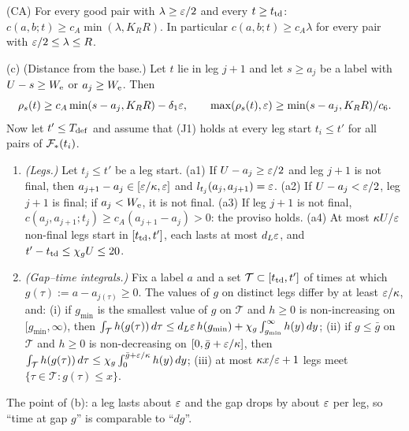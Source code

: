 \begin{lemma}[Toolkit]\label{lem:toolkit}
\textup{(CA)} For every good pair with $\lambda\ge\varepsilon/2$ and every $t\ge t_{\mathrm{td}}$: $c(a,b;t)\ge c_A\min(\lambda,K_RR)$.
In particular $c(a,b;t)\ge c_A\lambda$ for every pair with $\varepsilon/2\le\lambda\le R$.

\textup{(c) (Distance from the base.)} Let $t$ lie in leg $j+1$ and let $s\ge a_j$ be a label with $U-s\ge W_{\mathrm{e}}$ or
$a_j\ge W_{\mathrm{e}}$. Then
\[
\rho_s(t)\ge c_A\min(s-a_j,K_RR)-\delta_1\varepsilon,\qquad \max(\rho_s(t),\varepsilon)\ge\min(s-a_j,K_RR)/c_6 .
\]
Now let $t'\le T_{\mathrm{def}}$ and assume that \textup{(J1)} holds at every leg start $t_i\le t'$ for all pairs of $\mathcal{F}_*(t_i)$.
\begin{enumerate}
\setlength{\itemsep}{1pt}\setlength{\parskip}{0pt}
\item[\textup{(a)}] \emph{(Legs.)} Let $t_j\le t'$ be a leg start. (a1) If $U-a_j\ge\varepsilon/2$ and leg $j+1$ is not final,
then $a_{j+1}-a_j\in[\varepsilon/\kappa,\varepsilon]$ and $l_{t_j}(a_j,a_{j+1})=\varepsilon$. (a2) If $U-a_j<\varepsilon/2$, leg $j+1$ is final; if
$a_j<W_{\mathrm{e}}$, it is not final. (a3) If leg $j+1$ is not final, $c(a_j,a_{j+1};t_j)\ge c_A(a_{j+1}-a_j)>0$: the proviso
holds. (a4) At most $\kappa U/\varepsilon$ non-final legs start in $[t_{\mathrm{td}},t']$, each lasts at most $d_L\varepsilon$, and
$t'-t_{\mathrm{td}}\le\chi_gU\le20$.
\item[\textup{(b)}] \emph{(Gap--time integrals.)} Fix a label $a$ and a set $\mathcal T\subset[t_{\mathrm{td}},t']$ of times at
which $g(\tau):=a-a_{j(\tau)}\ge0$. The values of $g$ on distinct legs differ by at least $\varepsilon/\kappa$, and:
(i) if $g_{\min}$ is the smallest value of $g$ on $\mathcal T$ and $h\ge0$ is non-increasing on $[g_{\min},\infty)$,
then $\int_{\mathcal T}h(g(\tau))\,d\tau\le d_L\varepsilon\,h(g_{\min})+\chi_g\int_{g_{\min}}^\infty h(y)\,dy$;
(ii) if $g\le\bar g$ on $\mathcal T$ and $h\ge0$ is non-decreasing on $[0,\bar g+\varepsilon/\kappa]$, then
$\int_{\mathcal T}h(g(\tau))\,d\tau\le\chi_g\int_0^{\bar g+\varepsilon/\kappa}h(y)\,dy$;
(iii) at most $\kappa x/\varepsilon+1$ legs meet $\{\tau\in\mathcal T:g(\tau)\le x\}$.
\end{enumerate}
\end{lemma}

The point of (b): a leg lasts about $\varepsilon$ and the gap drops by about $\varepsilon$ per leg, so ``time at gap $g$'' is
comparable to ``$dg$''.

